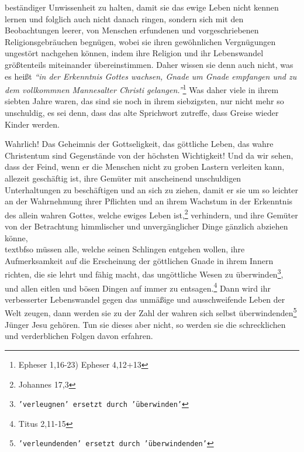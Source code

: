 {beständiger Unwissenheit zu halten, damit sie das ewige Leben nicht kennen
lernen und folglich auch nicht danach ringen, sondern sich mit den
Beobachtungen leerer, von Menschen erfundenen und vorgeschriebenen
Religionsgebräuchen begnügen, wobei sie ihren gewöhnlichen Vergnügungen
ungestört nachgehen können, indem ihre Religion und ihr Lebenswandel
größtenteils miteinander übereinstimmen. Daher wissen sie denn auch nicht, was
es heißt
\textit{"`in der Erkenntnis Gottes wachsen, Gnade um Gnade empfangen und zu
dem vollkommnen Mannesalter Christi gelangen."'}\footnote{Epheser 1,16-23)
Epheser 4,12+13}
Was daher viele in ihrem siebten Jahre waren, das sind sie noch in
ihrem siebzigsten, nur nicht mehr so unschuldig, es sei denn, dass das alte
Sprichwort zutreffe, dass Greise wieder Kinder werden.

\medskip

Wahrlich! Das Geheimnis der Gottseligkeit, das göttliche
Leben, das wahre
Christentum sind Gegenstände von der höchsten Wichtigkeit! Und da wir sehen,
dass der Feind, wenn er die Menschen nicht zu groben Lastern verleiten kann,
allezeit geschäftig ist, ihre Gemüter mit anscheinend unschuldigen
Unterhaltungen zu beschäftigen und an sich zu ziehen, damit er sie um so
leichter an der Wahrnehmung ihrer Pflichten und an ihrem Wachstum in der
Erkenntnis des allein wahren Gottes, welche ewiges Leben ist,\footnote{Johannes
17,3}
verhindern, und ihre Gemüter von der Betrachtung himmlischer und
unvergänglicher Dinge gänzlich abziehen könne,\\textbf{so müssen alle, welche
seinen
Schlingen entgehen wollen, ihre Aufmerksamkeit auf die Erscheinung der
göttlichen Gnade in ihrem Innern richten, die sie lehrt und fähig
macht, das
ungöttliche Wesen zu überwinden\footnote{\texttt{'verleugnen' ersetzt durch
'überwinden'}}, und allen eitlen
und bösen Dingen auf immer zu
entsagen.}\footnote{Titus 2,11-15}
Dann wird ihr verbesserter Lebenswandel gegen
das unmäßige und ausschweifende Leben der Welt zeugen, dann werden sie zu der
Zahl der wahren sich selbst überwindenden\footnote{\texttt{'verleundenden'
ersetzt durch 'überwindenden'}} Jünger Jesu
gehören. Tun sie dieses
aber nicht, so werden sie die schrecklichen und verderblichen Folgen davon
erfahren.

\medskip

}
